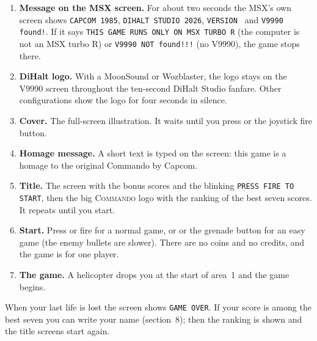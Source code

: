 \begin{enumerate}
\item \textbf{Message on the MSX screen.} For about two seconds the MSX's own screen shows \texttt{CAPCOM 1985},
\texttt{DIHALT STUDIO 2026}, \texttt{VERSION \portVersion} and \texttt{V9990 found!}. If it says \texttt{THIS GAME RUNS ONLY ON MSX TURBO R} (the computer is
not an MSX turbo R) or \texttt{V9990 NOT found!!!} (no V9990), the game stops there.
\item \textbf{DiHalt logo.} With a MoonSound or Wozblaster, the logo stays on the V9990 screen throughout the ten-second DiHalt Studio fanfare. Other configurations show the logo for four seconds in silence.
\item \textbf{Cover.} The full-screen illustration. It waits until you press  or the joystick fire button.
\item \textbf{Homage message.} A short text is typed on the screen: this game is a homage to the original Commando by
Capcom.
\item \textbf{Title.} The screen with the bonus scores and the blinking \texttt{PRESS FIRE TO START}, then the big
\textsc{Commando} logo with the ranking of the best seven scores. It repeats until you start.
\item \textbf{Start.} Press  or fire for a normal game, or  or the grenade button for an easy game (the
enemy bullets are slower). There are no coins and no credits, and the game is for one player.
\item \textbf{The game.} A helicopter drops you at the start of area~1 and the game begins.
\end{enumerate}

When your last life is lost the screen shows \texttt{GAME OVER}. If your score is among the best seven you can write your
name (section~8); then the ranking is shown and the title screens start again.
